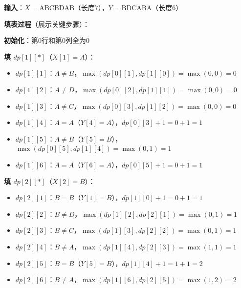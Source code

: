 \documentclass[12pt, a4paper]{ctexart}
\begin{document}
\begin{blackboard}

\textbf{输入}：$X = \text{ABCBDAB}$（长度7），$Y = \text{BDCABA}$（长度6）

\textbf{填表过程}（展示关键步骤）：

\textbf{初始化}：第0行和第0列全为0

\textbf{填 $dp[1][*]$}（$X[1] = A$）：
\begin{itemize}
    \item $dp[1][1]$：$A \neq B$，$\max(dp[0][1], dp[1][0]) = \max(0, 0) = 0$
    \item $dp[1][2]$：$A \neq D$，$\max(dp[0][2], dp[1][1]) = \max(0, 0) = 0$
    \item $dp[1][3]$：$A \neq C$，$\max(dp[0][3], dp[1][2]) = \max(0, 0) = 0$
    \item $dp[1][4]$：$A = A$（$Y[4]=A$），$dp[0][3] + 1 = 0 + 1 = 1$
    \item $dp[1][5]$：$A \neq B$（$Y[5]=B$），$\max(dp[0][5], dp[1][4]) = \max(0, 1) = 1$
    \item $dp[1][6]$：$A = A$（$Y[6]=A$），$dp[0][5] + 1 = 0 + 1 = 1$
\end{itemize}

\textbf{填 $dp[2][*]$}（$X[2] = B$）：
\begin{itemize}
    \item $dp[2][1]$：$B = B$（$Y[1]=B$），$dp[1][0] + 1 = 0 + 1 = 1$
    \item $dp[2][2]$：$B \neq D$，$\max(dp[1][2], dp[2][1]) = \max(0, 1) = 1$
    \item $dp[2][3]$：$B \neq C$，$\max(dp[1][3], dp[2][2]) = \max(0, 1) = 1$
    \item $dp[2][4]$：$B \neq A$，$\max(dp[1][4], dp[2][3]) = \max(1, 1) = 1$
    \item $dp[2][5]$：$B = B$（$Y[5]=B$），$dp[1][4] + 1 = 1 + 1 = 2$
    \item $dp[2][6]$：$B \neq A$，$\max(dp[1][6], dp[2][5]) = \max(1, 2) = 2$
\end{itemize}

\end{blackboard}
\end{document}

